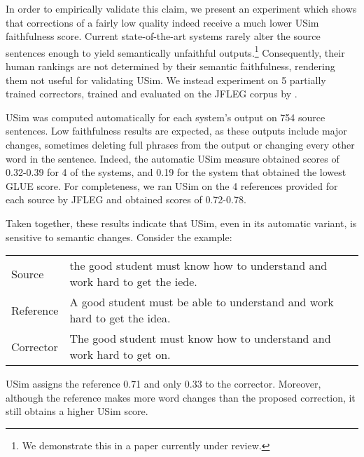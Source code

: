\documentclass[a4paper, 11pt]{article}
\begin{document}
In order to empirically validate this claim, we present an experiment which shows that corrections
of a fairly low quality indeed receive a much lower USim faithfulness score.
Current state-of-the-art systems rarely alter the source sentences enough to yield semantically unfaithful outputs.\footnote{We demonstrate this in a paper currently under review.}
Consequently, their human rankings are	 not determined by their semantic faithfulness, rendering them not useful for validating {\sc USim}.
We instead experiment on 5 partially trained correctors, trained and evaluated on the
JFLEG corpus \cite{napoles2017jfleg} by .

{\sc USim} was computed automatically for each system's output on 754 source sentences.
Low faithfulness results are expected, as these outputs include major changes,
sometimes deleting full phrases from the output or changing every other word in the sentence.
Indeed, the automatic USim measure obtained scores of 0.32-0.39 for 4 of the systems, and 0.19
for the system that obtained the lowest GLUE\cite{napoles2015ground} score.
For completeness, we ran {\sc USim} on the 4 references provided for each
source by JFLEG and obtained scores of 0.72-0.78.

Taken together, these results indicate that {\sc USim}, even in its automatic variant,
is sensitive to semantic changes. Consider the example: 

\begin{table}[h!]
	\vspace{-.3cm}
  \centering
  \label{ex:sensitive}
  \begin{tabular}{p{}p{}}
    Source    & \small the good student must know how to understand and work hard to get the iede.\\
    Reference & \small A good student must be able to understand and work hard to get the idea.\\
    Corrector & \small The good student must know how to understand and work hard to get on.     
  \end{tabular}
  
  \vspace{-.3cm}
\end{table}

{\sc USim} assigns the reference 0.71 and only 0.33 to the corrector.
Moreover, although the reference makes more word changes than the proposed correction,
it still obtains a higher {\sc USim} score.
\end{document}
